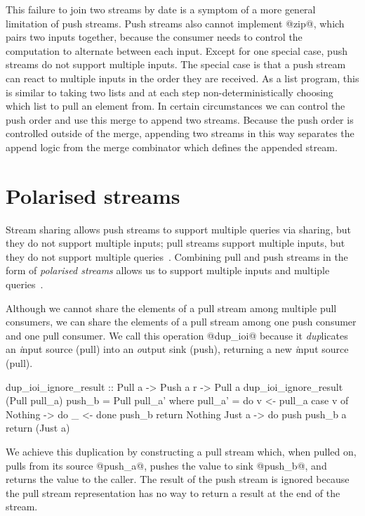 This failure to join two streams by date is a symptom of a more general limitation of push streams.
Push streams also cannot implement @zip@, which pairs two inputs together, because the consumer needs to control the computation to alternate between each input.
Except for one special case, push streams do not support multiple inputs.
The special case is that a push stream can react to multiple inputs in the order they are received.
As a list program, this is similar to taking two lists and at each step non-deterministically choosing which list to pull an element from.
In certain circumstances we can control the push order and use this merge to append two streams.
Because the push order is controlled outside of the merge, appending two streams in this way separates the append logic from the merge combinator which defines the appended stream.

\section{Polarised streams}
\label{taxonomy/polarised}

Stream sharing allows push streams to support multiple queries via sharing, but they do not support multiple inputs; pull streams support multiple inputs, but they do not support multiple queries~\citep{kay2009you}.
Combining pull and push streams in the form of \emph{polarised streams} allows us to support multiple inputs and multiple queries~\citep{lippmeier2016polarized}.


Although we cannot share the elements of a pull stream among multiple pull consumers, we can share the elements of a pull stream among one push consumer and one pull consumer.
We call this operation @dup_ioi@ because it \emph{dup}licates an \emph{i}nput source (pull) into an \emph{o}utput sink (push), returning a new \emph{i}nput source (pull).

\begin{haskell}
dup_ioi_ignore_result :: Pull a -> Push a r -> Pull a
dup_ioi_ignore_result (Pull pull_a) push_b = Pull pull_a'
 where
  pull_a' = do
    v <- pull_a
    case v of
     Nothing -> do
      _ <- done push_b
      return Nothing
     Just a -> do
      push push_b a
      return (Just a)
\end{haskell}

We achieve this duplication by constructing a pull stream which, when pulled on, pulls from its source @push_a@, pushes the value to sink @push_b@, and returns the value to the caller.
The result of the push stream is ignored because the pull stream representation has no way to return a result at the end of the stream.

